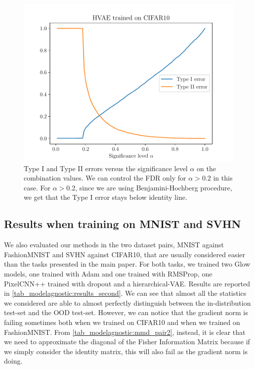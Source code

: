 {%
\begin{figure}[tb]
    \centering
    \includegraphics[scale=0.5]{graphics/paper_modelagnostic/cifar_hvae_type1_correct_font.pdf}
    \caption{Type I and Type II errors versus the significance level $\alpha$ on the combination values. We can control the FDR only for $\alpha > 0.2$ in this case. For $\alpha >0.2$, since we are using Benjamini-Hochberg procedure, we get that the Type I error stays below identity line.}
    \label{fig_modelagnostic:type1_cifar}
     \vspace*{-\baselineskip}
\end{figure}


\subsection{Results when training on MNIST and SVHN}
\label{appendix_modelagnostic:mnist_svhn}
We also evaluated our methods in the two dataset pairs, MNIST against FashionMNIST and SVHN against CIFAR10, that are usually considered easier than the tasks presented in the main paper. For both tasks, we trained two Glow models, one trained with Adam and one trained with RMSProp, one PixelCNN++ trained with dropout and a hierarchical-VAE. Results are reported in \cref{tab_modelagnostic:results_second}. We can see that almost all the statistics we considered are able to almost perfectly distinguish between the in-distribution test-set and the OOD test-set. However, we can notice that the gradient norm is failing sometimes both when we trained on CIFAR10 and when we trained on FashionMNIST. From \cref{tab_modelagnostic:mmd_pair2}, instead, it is clear that we need to approximate the diagonal of the Fisher Information Matrix because if we simply consider the identity matrix, this will also fail as the gradient norm is doing.

}

